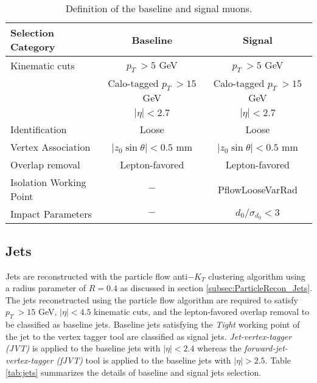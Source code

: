 \begin{table}[ht]
	\centering
		\caption{Definition of the baseline and signal muons.\label{tab:muon_baseline_signal}}
		\begin{tabular}{|| l || c | c ||}
		\hline
		Selection Category & \textbf{Baseline} & \textbf{Signal} \\
		\hline\hline
		Kinematic cuts & $p_{T}~ > 5$ GeV & $p_{T}~ > 5$ GeV \\
					& Calo-tagged $ p_{T}~ > 15$ GeV & Calo-tagged $ p_{T}~ > 15$ GeV \\
		      & $|\eta| < 2.7$ & $|\eta| < 2.7$\\
		\hline
		Identification & Loose & Loose \\
		\hline 
		Vertex Association & $|z_{0}\sin\theta| < 0.5$ mm & $|z_{0}\sin\theta|< 0.5$ mm\\
		\hline
		Overlap removal & Lepton-favored & Lepton-favored\\
		\hline
		Isolation Working Point & $-$ & PflowLooseVarRad\\
		\hline 
		Impact Parameters & $-$ & $d_{0}/\sigma_{d_{0}} < 3$ \\
		\hline
	\end{tabular}
\end{table}

\subsection{Jets}
\label{subsec:JetRecon}
Jets are reconstructed with the particle flow anti$-K_{T}$ clustering algorithm using a radius parameter of $R = 0.4$ as discussed in section \ref{subsec:ParticleRecon_Jets}. The jets reconstructed using the particle flow algorithm are required to satisfy $p_{T}~ > 15$ GeV, $ |\eta| < 4.5 $ kinematic cuts, and the lepton-favored overlap removal to be classified as baseline jets. Baseline jets satisfying the \textit{Tight} working point of the jet to the vertex tagger tool are classified as signal jets. \textit{Jet-vertex-tagger (JVT)} is applied to the baseline jets with $ |\eta| < 2.4 $ whereas the \textit{forward-jet-vertex-tagger (fJVT)} tool is applied to the baseline jets with $ |\eta| > 2.5 $. Table \ref{tab:jets} summarizes the details of baseline and signal jets selection. 

